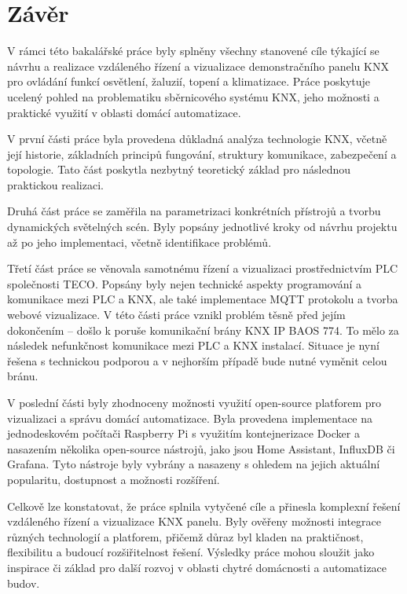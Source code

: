\chapter*{Závěr}
{}

V rámci této bakalářské práce byly splněny všechny stanovené cíle týkající se návrhu a realizace vzdáleného řízení a vizualizace demonstračního panelu KNX pro ovládání funkcí osvětlení, žaluzií, topení a klimatizace. Práce poskytuje ucelený pohled na problematiku sběrnicového systému KNX, jeho možnosti a praktické využití v oblasti domácí automatizace. 

V první části práce byla provedena důkladná analýza technologie KNX, včetně její historie, základních principů fungování, struktury komunikace, zabezpečení a topologie. Tato část poskytla nezbytný teoretický základ pro následnou praktickou realizaci. 

Druhá část práce se zaměřila na parametrizaci konkrétních přístrojů a tvorbu dynamických světelných scén. Byly popsány jednotlivé kroky od návrhu projektu až po jeho implementaci, včetně identifikace problémů. 

Třetí část práce se věnovala samotnému řízení a vizualizaci prostřednictvím PLC společnosti TECO. Popsány byly nejen technické aspekty programování a komunikace mezi PLC a KNX, ale také implementace MQTT protokolu a tvorba webové vizualizace. V této části práce vznikl problém těsně před jejím dokončením – došlo k poruše komunikační brány KNX IP BAOS 774. To mělo za následek nefunkčnost komunikace mezi PLC a KNX instalací. Situace je nyní řešena s technickou podporou a v nejhorším případě bude nutné vyměnit celou bránu.

V poslední části byly zhodnoceny možnosti využití open-source platforem pro vizualizaci a správu domácí automatizace. Byla provedena implementace na jednodeskovém počítači Raspberry Pi s využitím kontejnerizace Docker a nasazením několika open-source nástrojů, jako jsou Home Assistant, InfluxDB či Grafana. Tyto nástroje byly vybrány a nasazeny s ohledem na jejich aktuální popularitu, dostupnost a možnosti rozšíření.

Celkově lze konstatovat, že práce splnila vytyčené cíle a přinesla komplexní řešení vzdáleného řízení a vizualizace KNX panelu. Byly ověřeny možnosti integrace různých technologií a platforem, přičemž důraz byl kladen na praktičnost, flexibilitu a budoucí rozšiřitelnost řešení. Výsledky práce mohou sloužit jako inspirace či základ pro další rozvoj v oblasti chytré domácnosti a automatizace budov.
